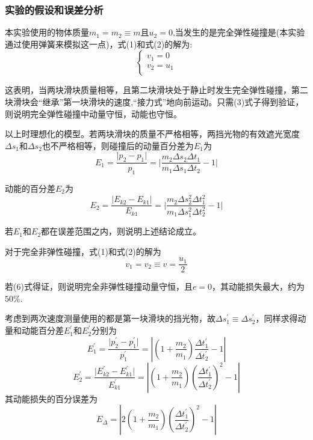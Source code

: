 \documentclass[UTF8]{article}
\begin{document}
	\subsubsection*{实验的假设和误差分析}
	\par 本实验使用的物体质量$m_1=m_2\equiv m$且$u_2=0$,当发生的是完全弹性碰撞是(本实验通过使用弹簧来模拟这一点)，式(1)和式(2)的解为:
	\begin{equation}
		\left\{
		\begin{matrix}
			v_1=0 \\
			v_2=u_1 \\
		\end{matrix}
		\right.
	\end{equation}
	\par 这表明，当两块滑块质量相等，且第二块滑块处于静止时发生完全弹性碰撞，第二块滑块会“继承”第一块滑块的速度,“接力式”地向前运动。只需(3)式子得到验证，则说明完全弹性碰撞中动量守恒，动能也守恒。
	\par 以上时理想化的模型。若两块滑块的质量不严格相等，两挡光物的有效遮光宽度$\Delta s_1$和$\Delta s_2$也不严格相等，则碰撞后的动量百分差为$E_1$为
	\begin{equation}
		E_1=\frac{\vert p_2-p_1 \vert}{p_1}=\vert \frac{m_2\Delta s_2\Delta t_1}{m_1\Delta s_1\Delta t_2}-1 \vert
	\end{equation}
	\par 动能的百分差$E_2$为
	\begin{equation}
		E_2=\frac{\vert E_{k2}-E_{k1} \vert}{E_{k1}}=\vert \frac{m_2\Delta s_2^2\Delta t_1^2}{m_1\Delta s_1^2\Delta t_2^2}-1 \vert
	\end{equation}
	\par 若$E_1$和$E_2$都在误差范围之内，则说明上述结论成立。
	\vspace*{1cm}
	\par 对于完全非弹性碰撞，式(1)和式(2)的解为
	\begin{equation}
		v_1=v_2\equiv v=\frac{u_1}{2}
	\end{equation}
	\par 若(6)式得证，则说明完全非弹性碰撞动量守恒，且$e=0$，其动能损失最大，约为$50\%$.
	\par 考虑到两次速度测量使用的都是第一块滑块的挡光物，故$\Delta s_1^{'} \equiv \Delta s_2^{'}$，同样求得动量和动能百分差$E_1^{'}$和$E_2^{'}$分别为
	\begin{equation}
		E_1^{'}=\frac{\vert p_2^{'}-p_1^{'} \vert}{p_1^{'}} =\left\vert \left(1+\frac{m_2}{m_1}\right)\frac{\Delta t_1^{'}}{\Delta t_2^{'}}-1 \right\vert
	\end{equation}
	\begin{equation}
		E_2^{'}=\frac{\vert E_{k2}^{'}-E_{k1}^{'} \vert}{E_{k1}^{'}}=\left\vert \left(1+\frac{m_2}{m_1}\right)\left(\frac{\Delta t_1^{'}}{\Delta t_2^{'}}\right)^2-1 \right\vert
	\end{equation}
	其动能损失的百分误差为
	\begin{equation}
		E_{\Delta} = \left\vert 2\left(1+\frac{m_2}{m_1}\right)\left(\frac{\Delta t_1^{'}}{\Delta t_2^{'}}\right)^2-1 \right\vert
	\end{equation}
	
\end{document}
